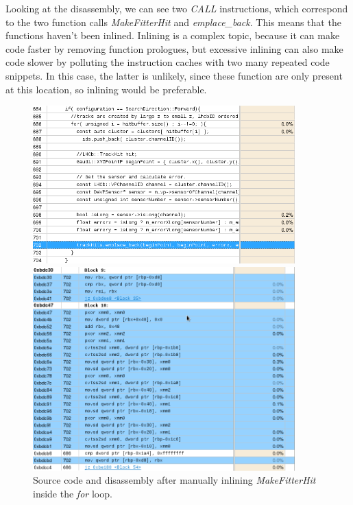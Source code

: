 \documentclass[12pt]{article}
\begin{document}
Looking at the disassembly, we can see two \textit{CALL} instructions, which correspond to the two function calls \textit{MakeFitterHit} and \textit{emplace\_back}. This means that the functions haven't been inlined. Inlining is a complex topic, because it can make code faster by removing function prologues, but excessive inlining can also make code slower by polluting the instruction caches with two many repeated code snippets. In this case, the latter is unlikely, since these function are only present at this location, so inlining would be preferable.

\begin{figure}[H]
	\begin{center}
		\includegraphics[width=0.9\textwidth]{kalmanfit_disasm_opt_src_inlined}
	\end{center}
	\begin{center}
		\includegraphics[width=0.9\textwidth]{kalmanfit_disasm_opt_asm_inlined}
	\end{center}
	\caption{Source code and disassembly after manually inlining \textit{MakeFitterHit} inside the \textit{for} loop.}
	\label{fig_kalman_disasm_src_inlined}
\end{figure}
\end{document}
